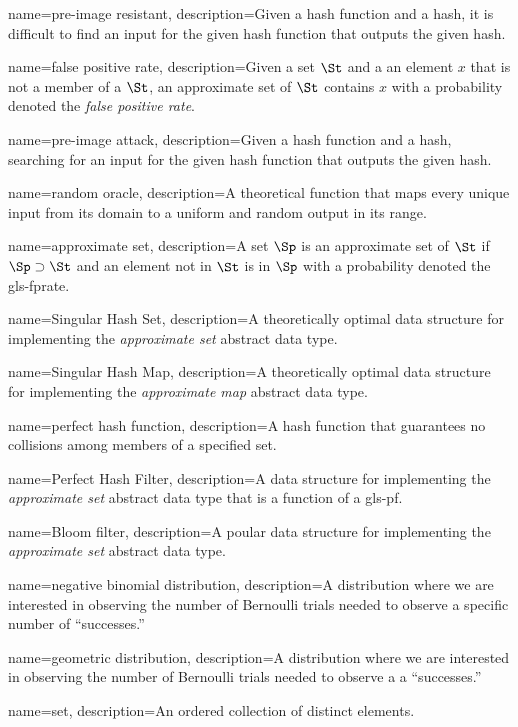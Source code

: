 {
    name={pre-image resistant},
    description={Given a hash function and a hash, it is difficult to find an input for the given hash function that outputs the given hash.}
}

{
    name={false positive rate},
    description={Given a set $\St$ and a an element $x$ that is not a member of a $\St$, an approximate set of $\St$ contains $x$ with a probability denoted the \emph{false positive rate}}.
}

{
    name={pre-image attack},
    description={Given a hash function and a hash, searching for an input for the given hash function that outputs the given hash.}
}

{
    name={random oracle},
    description={A theoretical function that maps every unique input from its domain to a uniform and random output in its range.}
}

{
    name={approximate set},
    description={A set $\Sp$ is an approximate set of $\St$ if $\Sp \supset \St$ and an element not in $\St$ is in $\Sp$ with a probability denoted the \gls*{gls-fprate}.}
}

{
    name={Singular Hash Set},
    description={A theoretically optimal data structure for implementing the \emph{approximate set} abstract data type.}
}

{
    name={Singular Hash Map},
    description={A theoretically optimal data structure for implementing the \emph{approximate map} abstract data type.}
}

{
    name={perfect hash function},
    description={A hash function that guarantees no collisions among members of a specified set.}
}

{
    name={Perfect Hash Filter},
    description={A data structure for implementing the \emph{approximate set} abstract data type that is a function of a \gls*{gls-pf}.}
}

{
    name={Bloom filter},
    description={A poular data structure for implementing the \emph{approximate set} abstract data type.}
}

{
    name={negative binomial distribution},
    description={A distribution where we are interested in observing the number of Bernoulli trials needed to observe a specific number of ``successes.''}
}

{
    name={geometric distribution},
    description={A distribution where we are interested in observing the number of Bernoulli trials needed to observe a a ``successes.''}
}

{
    name={set},
    description={An ordered collection of distinct elements.}
}

